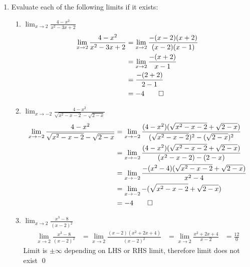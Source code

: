 \documentclass[12pt, a4paper]{article}
\begin{document}
\begin{enumerate}[Q\arabic*.]
\item Evaluate each of the following limits if it exists:
  \begin{enumerate}[(\alph*)]
    \item $\displaystyle \lim_{x\to2}\frac{4-x^2}{x^2-3x+2}$
      \begin{align*}
        \lim_{x\to2}\frac{4-x^2}{x^2-3x+2} &=  \lim_{x\to2}\frac{-(x-2)(x+2)}{(x-2)(x-1)} \\
                                           &=  \lim_{x\to2}\frac{-(x+2)}{x-1} \\
                                           &= \frac{-(2+2)}{2-1} \\
                                           &= -4 \qed
      \end{align*}
    \item $\displaystyle \lim_{x\to-2}\frac{4-x^2}{\sqrt{x^2-x-2}-\sqrt{2-x}}$
      \begin{align*}
        \lim_{x\to-2}\frac{4-x^2}{\sqrt{x^2-x-2}-\sqrt{2-x}} &= \lim_{x\to-2}\frac{(4-x^2)(\sqrt{x^2-x-2}+\sqrt{2-x})}{(\sqrt{x^2-x-2})^2-(\sqrt{2-x})^2} \\
                                                             &= \lim_{x\to-2}\frac{(4-x^2)(\sqrt{x^2-x-2}+\sqrt{2-x})}{(x^2-x-2)-(2-x)} \\
                                                             &= \lim_{x\to-2}\frac{-(x^2-4)(\sqrt{x^2-x-2}+\sqrt{2-x})}{x^2-4} \\
                                                             &= \lim_{x\to-2}-(\sqrt{x^2-x-2}+\sqrt{2-x}) \\
                                                             &= -4 \qed
      \end{align*}
    \item $\displaystyle \lim_{x\to2}\frac{x^3-8}{(x-2)^2}$
      \begin{align*}
        \lim_{x\to2}\frac{x^3-8}{(x-2)^2} &= \lim_{x\to2}\frac{(x-2)(x^2+2x+4)}{(x-2)^2}
                                          &= \lim_{x\to2}\frac{x^2+2x+4}{x-2}
                                          &= \frac{12}{0}
      \end{align*}
       Limit is $\pm\infty$ depending on LHS or RHS limit, therefore limit does not exist \qed
  \end{enumerate}


\end{enumerate}
\end{document}
